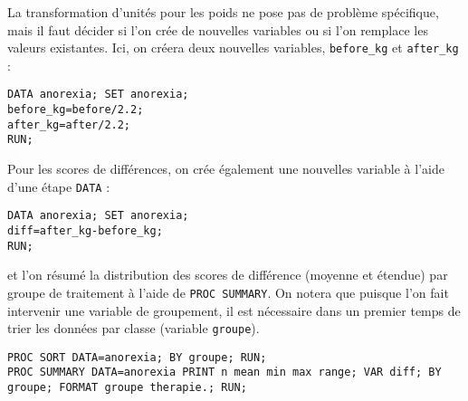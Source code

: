 La transformation d'unités pour les poids ne pose pas de problème
spécifique, mais il faut décider si l'on crée de nouvelles variables ou si
l'on remplace les valeurs existantes. Ici, on créera deux nouvelles
variables, \verb|before_kg| et \verb|after_kg| :
\begin{verbatim}
DATA anorexia; SET anorexia;
before_kg=before/2.2;
after_kg=after/2.2;
RUN;
\end{verbatim}

Pour les scores de différences, on crée également une nouvelles variable
à l'aide d'une étape \texttt{DATA} :
\begin{verbatim}
DATA anorexia; SET anorexia;
diff=after_kg-before_kg;
RUN;
\end{verbatim}
et l'on résumé la distribution des scores de différence (moyenne et étendue)
par groupe de traitement à l'aide de \texttt{PROC SUMMARY}. On notera que
puisque l'on fait intervenir une variable de groupement, il est nécessaire
dans un premier temps de trier les données par classe (variable
\texttt{groupe}). 
\begin{verbatim}
PROC SORT DATA=anorexia; BY groupe; RUN;
PROC SUMMARY DATA=anorexia PRINT n mean min max range; VAR diff; BY groupe; FORMAT groupe therapie.; RUN;
\end{verbatim}

